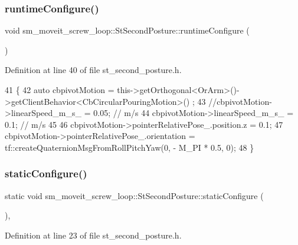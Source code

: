 \subsubsection{\texorpdfstring{runtime\+Configure()}{runtimeConfigure()}}
{\footnotesize\ttfamily void sm\+\_\+moveit\+\_\+screw\+\_\+loop\+::\+St\+Second\+Posture\+::runtime\+Configure (\begin{DoxyParamCaption}{ }\end{DoxyParamCaption})\hspace{0.3cm}{\ttfamily [inline]}}



Definition at line 40 of file st\+\_\+second\+\_\+posture.\+h.


\begin{DoxyCode}
41         \{
42             \textcolor{keyword}{auto} cbpivotMotion = this->getOrthogonal<OrArm>()->getClientBehavior<CbCircularPouringMotion>()
      ;
43             \textcolor{comment}{//cbpivotMotion->linearSpeed\_m\_s\_ = 0.05; // m/s}
44             cbpivotMotion->linearSpeed\_m\_s\_ = 0.1; \textcolor{comment}{// m/s}
45 
46             cbpivotMotion->pointerRelativePose\_.position.z = 0.1;
47             cbpivotMotion->pointerRelativePose\_.orientation = tf::createQuaternionMsgFromRollPitchYaw(0, -
      M\_PI * 0.5, 0);
48         \}
\end{DoxyCode}
\mbox{\label{structsm__moveit__screw__loop_1_1StSecondPosture_a704c12b1f6ee40039fa1c6f1e3ec0ba4}} 
\subsubsection{\texorpdfstring{static\+Configure()}{staticConfigure()}}
{\footnotesize\ttfamily static void sm\+\_\+moveit\+\_\+screw\+\_\+loop\+::\+St\+Second\+Posture\+::static\+Configure (\begin{DoxyParamCaption}{ }\end{DoxyParamCaption})\hspace{0.3cm}{\ttfamily [inline]}, {\ttfamily [static]}}



Definition at line 23 of file st\+\_\+second\+\_\+posture.\+h.


